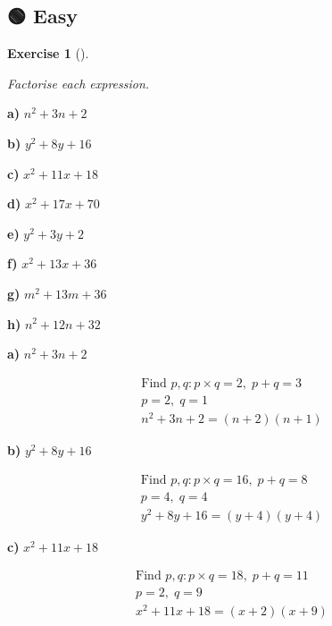 \documentclass[
  letterpaper,
  DIV=11,
  numbers=noendperiod]{scrreprt}
\theoremstyle{definition}
\newtheorem{exercise}{Exercise}[chapter]
\theoremstyle{remark}
\begin{document}
\subsection{🟢 Easy}

\begin{exercise}[]\protect\hypertarget{exr-u6-1}{}\label{exr-u6-1}

\emph{Factorise each expression.}

\textbf{a)} \(\displaystyle n^2 + 3n + 2\)

\textbf{b)} \(\displaystyle y^2 + 8y + 16\)

\textbf{c)} \(\displaystyle x^2 + 11x + 18\)

\textbf{d)} \(\displaystyle x^2 + 17x + 70\)

\textbf{e)} \(\displaystyle y^2 + 3y + 2\)

\textbf{f)} \(\displaystyle x^2 + 13x + 36\)

\textbf{g)} \(\displaystyle m^2 + 13m + 36\)

\textbf{h)} \(\displaystyle n^2 + 12n + 32\)

\begin{tcolorbox}[enhanced jigsaw, opacitybacktitle=0.6, coltitle=black, arc=.35mm, colframe=quarto-callout-tip-color-frame, colback=white, bottomrule=.15mm, left=2mm, colbacktitle=quarto-callout-tip-color!10!white, titlerule=0mm, opacityback=0, title=\textcolor{quarto-callout-tip-color}{\faLightbulb}\hspace{0.5em}{🔍 View Solutions}, leftrule=.75mm, breakable, rightrule=.15mm, bottomtitle=1mm, toptitle=1mm, toprule=.15mm]

\textbf{a)} \(\displaystyle n^2 + 3n + 2\)

\begin{align*}
\text{Find } p, q: p \times q = 2,\; p + q = 3 \\ p = 2,\; q = 1 \\ n^2 + 3n + 2 = (n + 2)(n + 1)
\end{align*}

\textbf{b)} \(\displaystyle y^2 + 8y + 16\)

\begin{align*}
\text{Find } p, q: p \times q = 16,\; p + q = 8 \\ p = 4,\; q = 4 \\ y^2 + 8y + 16 = (y + 4)(y + 4)
\end{align*}

\textbf{c)} \(\displaystyle x^2 + 11x + 18\)

\begin{align*}
\text{Find } p, q: p \times q = 18,\; p + q = 11 \\ p = 2,\; q = 9 \\ x^2 + 11x + 18 = (x + 2)(x + 9)
\end{align*}


\end{tcolorbox}
\end{exercise}
\end{document}
